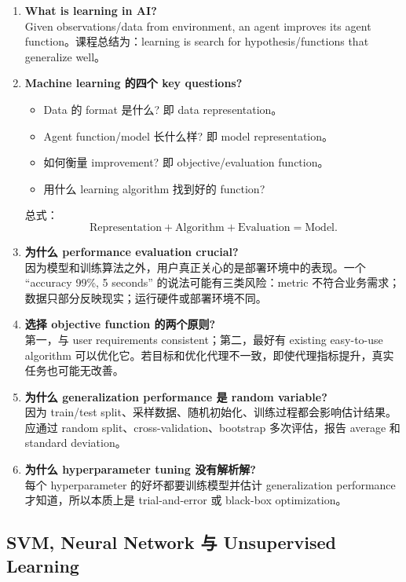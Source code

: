 \documentclass[UTF8,11pt,a4paper]{ctexart}
\begin{document}
\begin{enumerate}
\item \textbf{What is learning in AI?}\\
Given observations/data from environment, an agent improves its agent function。课程总结为：learning is search for hypothesis/functions that generalize well。

\item \textbf{Machine learning 的四个 key questions?}\\
\begin{itemize}
\item Data 的 format 是什么? 即 data representation。
\item Agent function/model 长什么样? 即 model representation。
\item 如何衡量 improvement? 即 objective/evaluation function。
\item 用什么 learning algorithm 找到好的 function?
\end{itemize}
总式：
\[
\text{Representation}+\text{Algorithm}+\text{Evaluation}=\text{Model}.
\]

\item \textbf{为什么 performance evaluation crucial?}\\
因为模型和训练算法之外，用户真正关心的是部署环境中的表现。一个 ``accuracy 99\%, 5 seconds'' 的说法可能有三类风险：metric 不符合业务需求；数据只部分反映现实；运行硬件或部署环境不同。

\item \textbf{选择 objective function 的两个原则?}\\
第一，与 user requirements consistent；第二，最好有 existing easy-to-use algorithm 可以优化它。若目标和优化代理不一致，即使代理指标提升，真实任务也可能无改善。

\item \textbf{为什么 generalization performance 是 random variable?}\\
因为 train/test split、采样数据、随机初始化、训练过程都会影响估计结果。应通过 random split、cross-validation、bootstrap 多次评估，报告 average 和 standard deviation。

\item \textbf{为什么 hyperparameter tuning 没有解析解?}\\
每个 hyperparameter 的好坏都要训练模型并估计 generalization performance 才知道，所以本质上是 trial-and-error 或 black-box optimization。
\end{enumerate}

\subsection{SVM, Neural Network 与 Unsupervised Learning}
\end{document}
